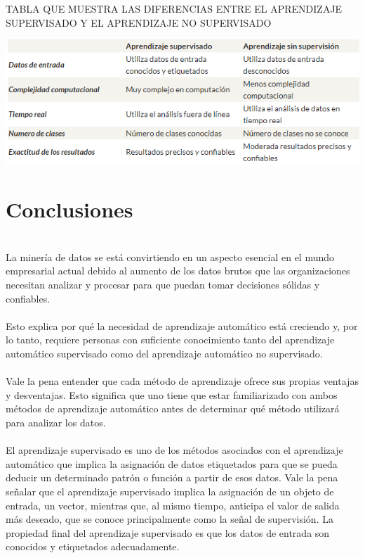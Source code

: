\documentclass[11pt,a4paper]{article}
\begin{document}
		\begin{center}
		\caption{TABLA QUE MUESTRA LAS DIFERENCIAS ENTRE EL APRENDIZAJE SUPERVISADO Y EL APRENDIZAJE NO SUPERVISADO}
		\end{center}
		
		\begin{center}	\includegraphics[scale=0.9]{./Imagenes/CuadroDiferencia}	
		\end{center}	
			
		
		\newpage
		\section{Conclusiones}
		\\La minería de datos se está convirtiendo en un aspecto esencial en el mundo empresarial actual debido al aumento de los datos brutos que las organizaciones necesitan analizar y procesar para que puedan tomar decisiones sólidas y confiables.\\
        
        \\Esto explica por qué la necesidad de aprendizaje automático está creciendo y, por lo tanto, requiere personas con suficiente conocimiento tanto del aprendizaje automático supervisado como del aprendizaje automático no supervisado.\\

        \\Vale la pena entender que cada método de aprendizaje ofrece sus propias ventajas y desventajas. Esto significa que uno tiene que estar familiarizado con ambos métodos de aprendizaje automático antes de determinar qué método utilizará para analizar los datos.\\
	
	    \\El aprendizaje supervisado es uno de los métodos asociados con el aprendizaje automático que implica la asignación de datos etiquetados para que se pueda deducir un determinado patrón o función a partir de esos datos. Vale la pena señalar que el aprendizaje supervisado implica la asignación de un objeto de entrada, un vector, mientras que, al mismo tiempo, anticipa el valor de salida más deseado, que se conoce principalmente como la señal de supervisión. La propiedad final del aprendizaje supervisado es que los datos de entrada son conocidos y etiquetados adecuadamente.\\
	    
\end{document}
